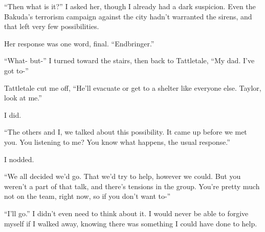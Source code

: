 ``Then what is it?''  I asked her, though I already had a dark suspicion.  Even the Bakuda's terrorism campaign against the city hadn't warranted the sirens, and that left very few possibilities.



Her response was one word, final. ``Endbringer.''



``What- but-''  I turned toward the stairs, then back to Tattletale, ``My dad.  I've got to-''



Tattletale cut me off, ``He'll evacuate or get to a shelter like everyone else.  Taylor, look at me.''



I did.



``The others and I, we talked about this possibility.  It came up before we met you.  You listening to me?  You know what happens, the usual response.''



I nodded.



``We all decided we'd go.  That we'd try to help, however we could.  But you weren't a part of that talk, and there's tensions in the group.  You're pretty much not on the team, right now, so if you don't want to-''



``I'll go.''  I didn't even need to think about it.  I would never be able to forgive myself if I walked away, knowing there was something I could have done to help.





